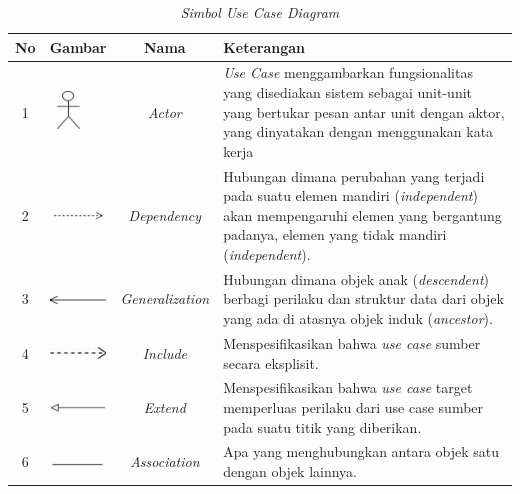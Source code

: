\begin{enumerate}
\captionsetup{position=above} %
\begin{longtable}[c]{|c|>{\centering\arraybackslash}m{2cm}|c|p{8cm}|}
\caption{\textit{Simbol Use Case Diagram}} \label{tab:my-table}\\ %
\hline
No & Gambar & Nama & Keterangan \\ \hline
\endfirsthead
%
\endhead
%
1 & \includegraphics[height=1cm, width=1cm]{useCase/actor.jpg} & \textit{Actor} & \textit{Use Case} menggambarkan fungsionalitas yang disediakan sistem sebagai unit-unit yang bertukar pesan antar unit dengan aktor, yang dinyatakan dengan menggunakan kata kerja \\ \hline
2 & \includegraphics[width=1.5cm]{useCase/dependency.png} & \textit{Dependency} & Hubungan dimana perubahan yang terjadi pada suatu elemen mandiri (\textit{independent}) akan mempengaruhi elemen yang bergantung padanya, elemen yang tidak mandiri (\textit{independent}). \\ \hline
3 & \includegraphics[width=1.5cm]{useCase/generalization.jpg} & \textit{Generalization} & Hubungan dimana objek anak (\textit{descendent}) berbagi perilaku dan struktur data dari objek yang ada di atasnya objek induk (\textit{ancestor}). \\ \hline
4 & \includegraphics[width=1.5cm]{useCase/include.jpg} & \textit{Include} & Menspesifikasikan bahwa \textit{use case} sumber secara eksplisit. \\ \hline
5 & \includegraphics[width=1.5cm]{useCase/extend.png} & \textit{Extend} & Menspesifikasikan bahwa \textit{use case} target memperluas perilaku dari use case sumber pada suatu titik yang diberikan. \\ \hline
6 & \includegraphics[width=1.5cm]{useCase/association.png} & \textit{Association} & Apa yang menghubungkan antara objek satu dengan objek lainnya. \\ \hline

\end{longtable}
\end{enumerate}
